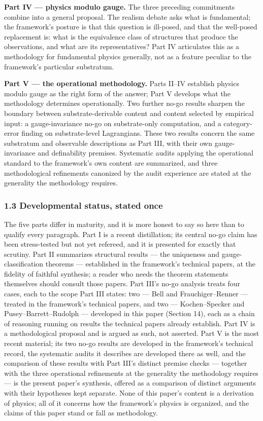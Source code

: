 \documentclass[
]{article}
\begin{document}
\textbf{Part IV --- physics modulo gauge.} The three preceding
commitments combine into a general proposal. The realism debate asks
what is fundamental; the framework's posture is that this question is
ill-posed, and that the well-posed replacement is: what is the
equivalence class of structures that produce the observations, and what
are its representatives? Part IV articulates this as a methodology for
fundamental physics generally, not as a feature peculiar to the
framework's particular substratum.

\textbf{Part V --- the operational methodology.} Parts II--IV establish
physics modulo gauge as the right form of the answer; Part V develops
what the methodology determines operationally. Two further no-go results
sharpen the boundary between substrate-derivable content and content
selected by empirical input: a gauge-invariance no-go on substrate-only
computation, and a category-error finding on substrate-level
Lagrangians. These two results concern the same substratum and
observable descriptions as Part III, with their own gauge-invariance and
definability premises. Systematic audits applying the operational
standard to the framework's own content are summarized, and three
methodological refinements canonized by the audit experience are stated
at the generality the methodology requires.

\hypertarget{developmental-status-stated-once}{%
\subsubsection{1.3 Developmental status, stated
once}\label{developmental-status-stated-once}}

The five parts differ in maturity, and it is more honest to say so here
than to qualify every paragraph. Part I is a recent distillation; its
central no-go claim has been stress-tested but not yet refereed, and it
is presented for exactly that scrutiny. Part II summarizes structural
results --- the uniqueness and gauge-classification theorems ---
established in the framework's technical papers, at the fidelity of
faithful synthesis; a reader who needs the theorem statements themselves
should consult those papers. Part III's no-go analysis treats four
cases, each to the scope Part III states: two --- Bell and
Frauchiger--Renner --- treated in the framework's technical papers, and
two --- Kochen--Specker and Pusey--Barrett--Rudolph --- developed in
this paper (Section 14), each as a chain of reasoning running on results
the technical papers already establish. Part IV is a methodological
proposal and is argued as such, not asserted. Part V is the most recent
material; its two no-go results are developed in the framework's
technical record, the systematic audits it describes are developed there
as well, and the comparison of these results with Part III's distinct
premise checks --- together with the three operational refinements at
the generality the methodology requires --- is the present paper's
synthesis, offered as a comparison of distinct arguments with their
hypotheses kept separate. None of this paper's content is a derivation
of physics; all of it concerns how the framework's physics is organized,
and the claims of this paper stand or fall as methodology.
\end{document}
